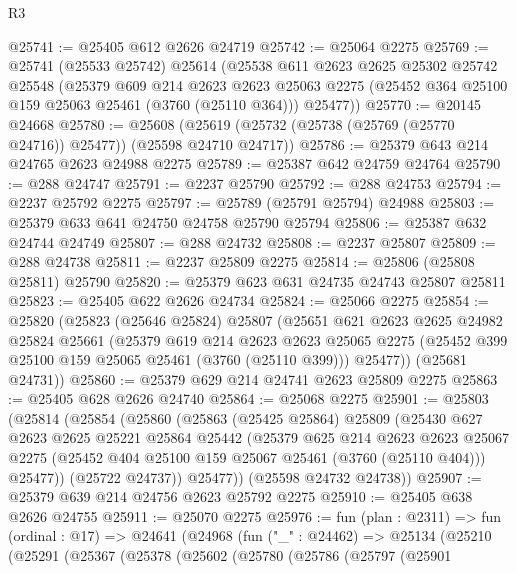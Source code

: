 \begin{lexlean}{R3}
\begin{coremodule}
@25741 := @25405 @612 @2626 @24719
@25742 := @25064 @2275
@25769 := @25741
    (@25533 @25742)
    @25614
    (@25538
      @611
      @2623
      @2625
      @25302
      @25742
      @25548
      (@25379
        @609
        @214
        @2623
        @2623
        @25063
        @2275
        (@25452 @364 @25100 @159 @25063 @25461 (@3760 (@25110 @364)))
        @25477))
@25770 := @20145 @24668
@25780 := @25608 (@25619 (@25732 (@25738 (@25769 (@25770 @24716)) @25477)) (@25598 @24710 @24717))
@25786 := @25379 @643 @214 @24765 @2623 @24988 @2275
@25789 := @25387 @642 @24759 @24764
@25790 := @288 @24747
@25791 := @2237 @25790
@25792 := @288 @24753
@25794 := @2237 @25792 @2275
@25797 := @25789 (@25791 @25794) @24988
@25803 := @25379 @633 @641 @24750 @24758 @25790 @25794
@25806 := @25387 @632 @24744 @24749
@25807 := @288 @24732
@25808 := @2237 @25807
@25809 := @288 @24738
@25811 := @2237 @25809 @2275
@25814 := @25806 (@25808 @25811) @25790
@25820 := @25379 @623 @631 @24735 @24743 @25807 @25811
@25823 := @25405 @622 @2626 @24734
@25824 := @25066 @2275
@25854 := @25820
    (@25823
      (@25646 @25824)
      @25807
      (@25651
        @621
        @2623
        @2625
        @24982
        @25824
        @25661
        (@25379
          @619
          @214
          @2623
          @2623
          @25065
          @2275
          (@25452 @399 @25100 @159 @25065 @25461 (@3760 (@25110 @399)))
          @25477))
      (@25681 @24731))
@25860 := @25379 @629 @214 @24741 @2623 @25809 @2275
@25863 := @25405 @628 @2626 @24740
@25864 := @25068 @2275
@25901 := @25803
    (@25814
      (@25854
        (@25860
          (@25863
            (@25425 @25864)
            @25809
            (@25430
              @627
              @2623
              @2625
              @25221
              @25864
              @25442
              (@25379
                @625
                @214
                @2623
                @2623
                @25067
                @2275
                (@25452 @404 @25100 @159 @25067 @25461 (@3760 (@25110 @404)))
                @25477))
            (@25722 @24737))
          @25477))
      (@25598 @24732 @24738))
@25907 := @25379 @639 @214 @24756 @2623 @25792 @2275
@25910 := @25405 @638 @2626 @24755
@25911 := @25070 @2275
@25976 := fun (plan : @2311) =>
  fun (ordinal : @17) =>
  @24641
    (@24968
      (fun ("_" : @24462) =>
      @25134
        (@25210
          (@25291
            (@25367
              (@25378
                (@25602
                  (@25780
                    (@25786
                      (@25797
                        (@25901

\end{coremodule}
\end{lexlean}
